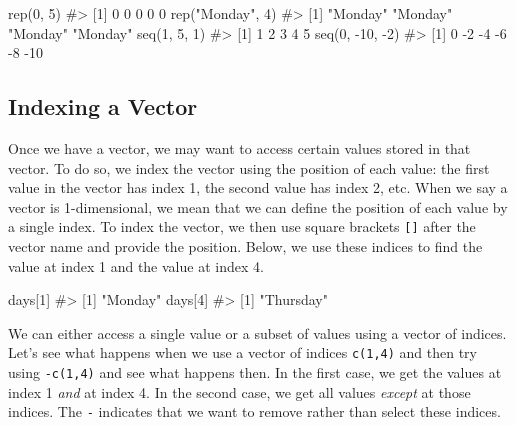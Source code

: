 \documentclass[
  letterpaper,
]{krantz}
\makeatletter
\newenvironment{Shaded}{\begin{snugshade}}{\end{snugshade}}
\newcommand{\CommentTok}[1]{\textcolor[rgb]{0.37,0.37,0.37}{#1}}
\newcommand{\DecValTok}[1]{\textcolor[rgb]{0.68,0.00,0.00}{#1}}
\newcommand{\FunctionTok}[1]{\textcolor[rgb]{0.28,0.35,0.67}{#1}}
\newcommand{\NormalTok}[1]{\textcolor[rgb]{0.00,0.23,0.31}{#1}}
\newcommand{\SpecialCharTok}[1]{\textcolor[rgb]{0.37,0.37,0.37}{#1}}
\newcommand{\StringTok}[1]{\textcolor[rgb]{0.13,0.47,0.30}{#1}}
\newenvironment{kframe}{%
\medskip{}
\setlength{\fboxsep}{.8em}
 \def\at@end@of@kframe{}%
 \ifinner\ifhmode%
  \def\at@end@of@kframe{\end{minipage}}%
  \begin{minipage}{\columnwidth}%
 \fi\fi%
 \def\FrameCommand##1{\hskip\@totalleftmargin \hskip-\fboxsep
 \colorbox{shadecolor}{##1}\hskip-\fboxsep
     \hskip-\linewidth \hskip-\@totalleftmargin \hskip\columnwidth}%
 \MakeFramed {\advance\hsize-\width
   \@totalleftmargin\z@ \linewidth\hsize
   \@setminipage}}%
 {\par\unskip\endMakeFramed%
 \at@end@of@kframe}
\renewenvironment{Shaded}{\begin{kframe}}{\end{kframe}}
\makeatother
\begin{document}
\begin{Shaded}
\begin{Highlighting}[]
\FunctionTok{rep}\NormalTok{(}\DecValTok{0}\NormalTok{, }\DecValTok{5}\NormalTok{)}
\CommentTok{\#\textgreater{} [1] 0 0 0 0 0}
\FunctionTok{rep}\NormalTok{(}\StringTok{"Monday"}\NormalTok{, }\DecValTok{4}\NormalTok{)}
\CommentTok{\#\textgreater{} [1] "Monday" "Monday" "Monday" "Monday"}
\FunctionTok{seq}\NormalTok{(}\DecValTok{1}\NormalTok{, }\DecValTok{5}\NormalTok{, }\DecValTok{1}\NormalTok{)}
\CommentTok{\#\textgreater{} [1] 1 2 3 4 5}
\FunctionTok{seq}\NormalTok{(}\DecValTok{0}\NormalTok{, }\SpecialCharTok{{-}}\DecValTok{10}\NormalTok{, }\SpecialCharTok{{-}}\DecValTok{2}\NormalTok{)}
\CommentTok{\#\textgreater{} [1]   0  {-}2  {-}4  {-}6  {-}8 {-}10}
\end{Highlighting}
\end{Shaded}

\subsection{Indexing a Vector}\label{indexing-a-vector}

Once we have a vector, we may want to access certain values stored in
that vector. To do so, we index the vector using the position of each
value: the first value in the vector has index 1, the second value has
index 2, etc. When we say a vector is 1-dimensional, we mean that we can
define the position of each value by a single index. To index the
vector, we then use square brackets \texttt{{[}{]}} after the vector
name and provide the position. Below, we use these indices to find the
value at index 1 and the value at index 4.

\begin{Shaded}
\begin{Highlighting}[]
\NormalTok{days[}\DecValTok{1}\NormalTok{]}
\CommentTok{\#\textgreater{} [1] "Monday"}
\NormalTok{days[}\DecValTok{4}\NormalTok{]}
\CommentTok{\#\textgreater{} [1] "Thursday"}
\end{Highlighting}
\end{Shaded}

We can either access a single value or a subset of values using a vector
of indices. Let's see what happens when we use a vector of indices
\texttt{c(1,4)} and then try using \texttt{-c(1,4)} and see what happens
then. In the first case, we get the values at index 1 \emph{and} at
index 4. In the second case, we get all values \emph{except} at those
indices. The \texttt{-} indicates that we want to remove rather than
select these indices.
\end{document}
